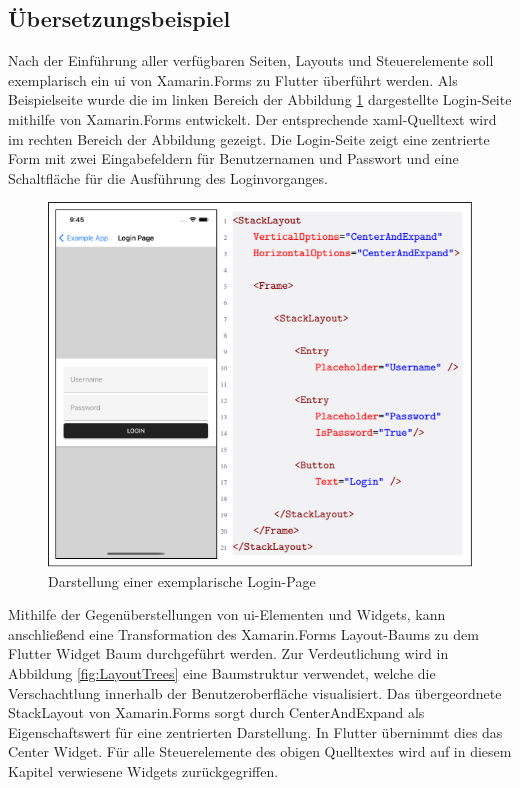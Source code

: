 \subsection{Übersetzungsbeispiel}
Nach der Einführung aller verfügbaren Seiten,  Layouts und Steuerelemente soll exemplarisch ein \ac{ui} von Xamarin.Forms zu Flutter überführt werden.  Als Beispielseite wurde die im linken Bereich der Abbildung \ref{fig:ExamplePage} dargestellte Login-Seite mithilfe von Xamarin.Forms entwickelt.  Der entsprechende \ac{xaml}-Quelltext wird im rechten Bereich der Abbildung gezeigt.  Die Login-Seite zeigt eine zentrierte Form mit zwei Eingabefeldern für Benutzernamen und Passwort und eine Schaltfläche für die Ausführung des Loginvorganges.  


\begin{figure}[!ht]
 \includegraphics[width=\textwidth,height=\textheight,keepaspectratio]{Images/CrossPlattformFrameworks/ExamplePage.png}
 \caption{Darstellung einer exemplarische Login-Page}
 \label{fig:ExamplePage}
\end{figure}

Mithilfe der Gegenüberstellungen von \ac{ui}-Elementen und Widgets,  kann anschließend eine Transformation des Xamarin.Forms Layout-Baums zu dem Flutter Widget Baum durchgeführt werden.  Zur Verdeutlichung wird in Abbildung \ref{fig:LayoutTrees} eine Baumstruktur verwendet,  welche die Verschachtlung innerhalb der Benutzeroberfläche visualisiert. Das übergeordnete \glq StackLayout\grq{} von Xamarin.Forms sorgt durch \glq CenterAndExpand\grq{}  als Eigenschaftswert für eine zentrierten Darstellung.  In Flutter übernimmt dies das \glq Center\grq{} Widget.  Für alle  Steuerelemente des obigen Quelltextes wird auf in diesem Kapitel verwiesene Widgets zurückgegriffen. 

